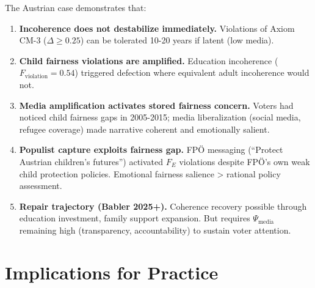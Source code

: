 The Austrian case demonstrates that:
\begin{enumerate}
\item \textbf{Incoherence does not destabilize immediately.} Violations of Axiom CM-3 ($\Delta \geq 0.25$)
can be tolerated 10-20 years if latent (low media).

\item \textbf{Child fairness violations are amplified.} Education incoherence ($F_{\text{violation}} = 0.54$)
triggered defection where equivalent adult incoherence would not.

\item \textbf{Media amplification activates stored fairness concern.} Voters had noticed child
fairness gaps in 2005-2015; media liberalization (social media, refugee coverage) made narrative
coherent and emotionally salient.

\item \textbf{Populist capture exploits fairness gap.} FPÖ messaging (``Protect Austrian children's
futures'') activated $F_E$ violations despite FPÖ's own weak child protection policies. Emotional
fairness salience > rational policy assessment.

\item \textbf{Repair trajectory (Babler 2025+).} Coherence recovery possible through education
investment, family support expansion. But requires $\Psi_{\text{media}}$ remaining high
(transparency, accountability) to sustain voter attention.

\end{enumerate}

\section{Implications for Practice}
\label{sec:cm-practice}


